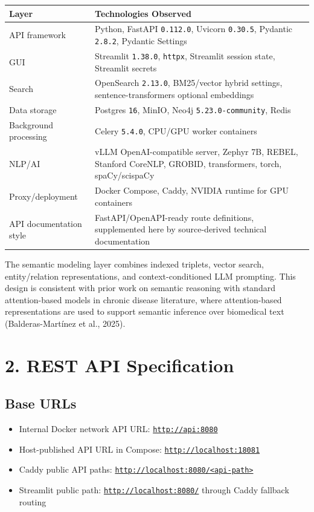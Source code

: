 \documentclass[10pt,letterpaper]{article}
\begin{document}
\begin{scriptsize}
\begin{longtable}{>{\raggedright\arraybackslash}p{3.35in}>{\raggedright\arraybackslash}p{3.35in}}
Layer & Technologies Observed \\
\hline
API framework & Python, FastAPI \texttt{0.112.0}, Uvicorn \texttt{0.30.5}, Pydantic \texttt{2.8.2}, Pydantic Settings \\
GUI & Streamlit \texttt{1.38.0}, \texttt{httpx}, Streamlit session state, Streamlit secrets \\
Search & OpenSearch \texttt{2.13.0}, BM25/vector hybrid settings, sentence-transformers optional embeddings \\
Data storage & Postgres \texttt{16}, MinIO, Neo4j \texttt{5.23.0-community}, Redis \\
Background processing & Celery \texttt{5.4.0}, CPU/GPU worker containers \\
NLP/AI & vLLM OpenAI-compatible server, Zephyr 7B, REBEL, Stanford CoreNLP, GROBID, transformers, torch, spaCy/scispaCy \\
Proxy/deployment & Docker Compose, Caddy, NVIDIA runtime for GPU containers \\
API documentation style & FastAPI/OpenAPI-ready route definitions, supplemented here by source-derived technical documentation \\
\end{longtable}
\end{scriptsize}

The semantic modeling layer combines indexed triplets, vector search, entity/relation representations, and context-conditioned LLM prompting. This design is consistent with prior work on semantic reasoning with standard attention-based models in chronic disease literature, where attention-based representations are used to support semantic inference over biomedical text (Balderas-Mart\'inez et al., 2025).

\section{2. REST API Specification}

\subsection{Base URLs}

\begin{itemize}
\item Internal Docker network API URL: \texttt{\url{http://api:8080}}
\item Host-published API URL in Compose: \texttt{\url{http://localhost:18081}}
\item Caddy public API paths: \texttt{\url{http://localhost:8080/<api-path>}}
\item Streamlit public path: \texttt{\url{http://localhost:8080/}} through Caddy fallback routing
\end{itemize}
\end{document}
